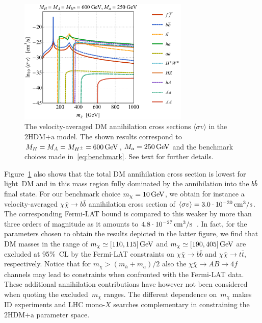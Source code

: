 \documentclass[a4paper, 11pt,notoc]{article}
\newcommand{\hdma}{\ensuremath{\textrm{2HDM+a}}\xspace}
\begin{document}
\begin{figure}[t!]
\centering
\includegraphics[width=0.725\textwidth]{IDbenchmark.pdf}
\vspace{4mm}
\caption{The velocity-averaged DM annihilation cross sections $\langle \sigma v \rangle$ in the \hdma model. The shown results correspond to $M_H = M_A = M_{H^\pm} = 600 \, {\rm GeV}$, $M_a = 250 \, {\rm GeV}$ and the benchmark choices made in~\eqref{eq:benchmark}. See text for further details. }
\label{fig:IDbenchmark}
\end{figure}

Figure~\ref{fig:IDbenchmark} also shows that the total DM annihilation cross section is lowest for light~DM and in this mass region fully dominated by the annihilation into the $b \bar b$ final state. For our benchmark choice $m_\chi = 10 \, {\rm GeV}$, we obtain  for instance a velocity-averaged $\chi \bar \chi \to b \bar b$ annihilation cross section   of  $\langle \sigma v \rangle = 3.0 \cdot 10^{-30} \, {\rm cm}^3/{\rm s}$. The corresponding Fermi-LAT bound is compared to this weaker by more than three orders of magnitude as it amounts to $4.8 \cdot 10^{-27} \, {\rm cm}^3/{\rm s}$~\cite{Fermi-LAT:2016uux}.  In fact, for the parameters chosen to obtain the results depicted in the latter figure, we find that DM masses in the range of $m_\chi \simeq [110, 115] \, {\rm GeV}$ and $m_\chi \simeq [190, 405] \, {\rm GeV}$ are excluded at 95\%~CL by the Fermi-LAT constraints on $\chi \bar \chi \to b \bar b$ and $\chi \bar \chi \to t \bar t$, respectively. Notice that for $m_\chi > (m_h + m_a)/2$ also the $\chi \bar \chi \to A B \to 4f$ channels may lead to constraints when confronted with the Fermi-LAT data. These additional annihilation contributions have however not been considered when quoting the excluded~$m_\chi$ ranges. The different dependence on~$m_\chi$ makes ID experiments and LHC mono-$X$ searches    complementary in constraining the \hdma parameter space. 
\end{document}

